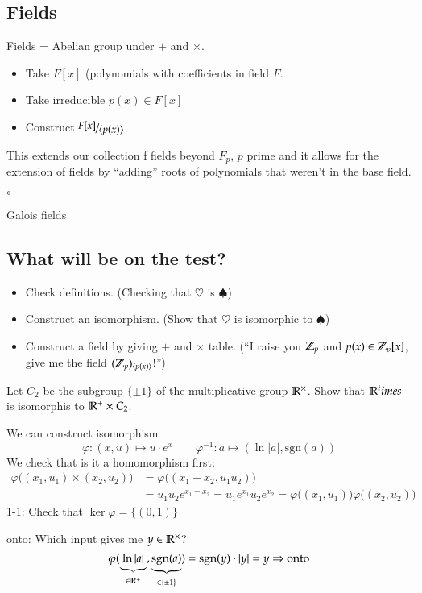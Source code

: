 \subsection{Fields}
Fields = Abelian group under $+$ and $\times$. 
\begin{itemize}
	\item Take $F[x]$ (polynomials with coefficients in field $F$. 
	\item Take irreducible $p(x)\in F[x]$
	\item Construct $\nicefrac{F[x]}{\langle p(x)\rangle}$
\end{itemize}
This extends our collection f fields beyond $F_p$, $p$ prime and it allows for the extension of fields by ``adding'' roots of polynomials that weren't in the base field. 
\begin{list}{$\circ$}{}  
	\item Galois fields
\end{list}

\subsection{What will be on the test? }
\begin{itemize}
	\item Check definitions. (Checking that $\heartsuit$ is $\spadesuit$)
	\item Construct an isomorphism. (Show that $\heartsuit$ is isomorphic to $\spadesuit$)
	\item Construct a field by giving $+$ and $\times$ table. (``I raise you $\mathbb{Z}_p$ and $p(x)\in \mathbb{Z}_p[x]$, give me the field $(\mathbb{Z}_p)_{\langle p(x)\rangle}$!'')
\end{itemize}

\exercise Let $C_2$ be the subgroup $\{\pm 1\}$ of the multiplicative group $\mathbb{R}^\times$. Show that $\mathbb{R}^times$ is isomorphis to $\mathbb{R}^+ \times C_2$. 

We can construct isomorphism
\[\varphi: (x, u) \mapsto u\cdot e^x\qquad \varphi^{-1}:a\mapsto (\ln|a|, \mathrm{sgn}(a))\]
We check that is it a homomorphism first: 
\begin{align*}
	\varphi\big((x_1, u_1)\times (x_2, u_2)\big)&=\varphi\big((x_1+x_2, u_1u_2)\big) \\
	&=u_1u_2e^{x_1+x_2}=u_1e^{x_1}u_2e^{x_2} = \varphi\big((x_1,u_1)\big)\varphi\big((x_2,u_2)\big)
\end{align*}
1-1: Check that $\ker\varphi=\{(0,1)\}$

onto: Which input gives me $y\in \mathbb{R}^{\times}$? 
\[\varphi(\underbrace{\ln|a|}_{\in \mathbb{R}^+}, \underbrace{\mathrm{sgn}(a)}_{\in\{\pm 1\}}) = \mathrm{sgn}(y)\cdot |y| = y\Rightarrow\text{onto}\]
